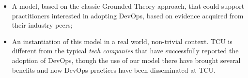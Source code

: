 \begin{itemize}
\item A model, based on the classic Grounded Theory approach, that could support practitioners interested in adopting DevOps,
      based on evidence acquired from their industry peers;
\item An instantiation of this model in a real world, non-trivial context. TCU is different from the typical \emph{tech companies} 
that have successfully reported the adoption of DevOps, though the use of our model there have brought several benefits and
now DevOps practices have been disseminated at TCU.
\end{itemize}









%



